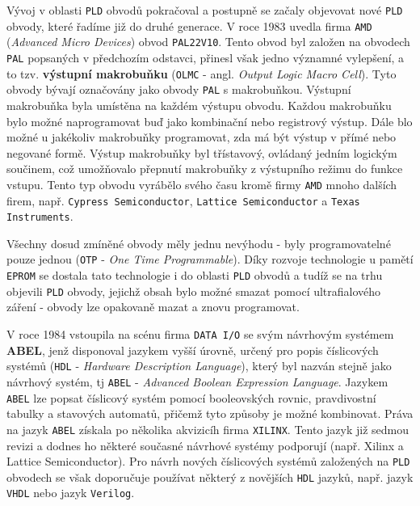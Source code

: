 {      Vývoj v oblasti \texttt{PLD} obvodů pokračoval a postupně se začaly objevovat nové
      \texttt{PLD} obvody, které řadíme již do druhé generace. V roce 1983 uvedla firma
      \texttt{AMD} (\emph{Advanced Micro Devices}) obvod \texttt{PAL22V10}. Tento obvod byl založen
      na obvodech \texttt{PAL} popsaných v předchozím odstavci, přinesl však jedno významné
      vylepšení, a to tzv. \textbf{výstupní makrobuňku} (\texttt{OLMC} - angl. \emph{Output Logic
      Macro Cell}). Tyto obvody bývají označovány jako obvody \texttt{PAL} s makrobuňkou. Výstupní
      makrobuňka byla umístěna na každém výstupu obvodu. Každou makrobuňku bylo možné naprogramovat
      buď jako kombinační nebo registrový výstup. Dále blo možné u jakékoliv makrobuňky
      programovat, zda má být výstup v přímé nebo negované formě. Výstup makrobuňky byl třístavový,
      ovládaný jedním logickým součinem, což umož\-ňo\-va\-lo přepnutí makrobuňky z výstupního
      režimu do funkce vstupu. Tento typ obvodu vyrábělo svého času kromě firmy \texttt{AMD} mnoho
      dalších firem, např. \texttt{Cypress Semiconductor}, \texttt{Lattice Semiconductor} a
      \texttt{Texas Instruments}.
      
      Všechny dosud zmíněné obvody měly jednu nevýhodu - byly programovatelné pou\-ze jednou
      (\texttt{OTP} - \emph{One Time Programmable}). Díky rozvoje technologie u pamětí
      \texttt{EPROM} se dostala tato technologie i do oblasti \texttt{PLD} obvodů a tudíž se na
      trhu objevili \texttt{PLD} obvody, jejichž obsah bylo možné smazat pomocí ultrafialového
      záření - obvody lze opakovaně mazat a znovu programovat.
      
      V roce 1984 vstoupila na scénu firma \texttt{DATA I/O} se svým návrhovým systémem
      \textbf{ABEL}, jenž disponoval jazykem vyšší úrovně, určený pro popis číslicových systémů
      (\texttt{HDL} - \emph{Hardware Description Language}), který byl nazván stejně jako návrhový
      systém, tj \texttt{ABEL} - \emph{Advanced Boolean Expression Language}. Jazykem \texttt{ABEL}
      lze popsat číslicový systém pomocí booleovských rovnic, pravdivostní tabulky a stavových
      automatů, přičemž tyto způsoby je možné kombinovat. Práva na jazyk \texttt{ABEL} získala po
      několika akvizicíh firma \texttt{XILINX}. Tento jazyk již sedmou revizi a dodnes ho některé
      současné návrhové systémy podporují (např. Xilinx a Lattice Semiconductor). Pro návrh nových
      číslicových systémů založených na \texttt{PLD} obvodech se však doporučuje používat některý z
      novějších \texttt{HDL} jazyků, např. jazyk \texttt{VHDL} nebo jazyk \texttt{Verilog}.
      
}
